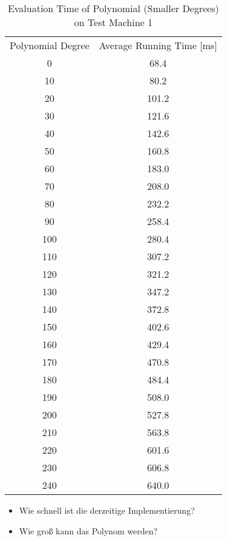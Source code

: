 \begin{table}[ht]
  \centering
  \begin{tabular}{|c|c|}
    Polynomial Degree & Average Running Time [ms] \\
    0  & 68.4 \\
    10 &  80.2 \\
    20 & 101.2 \\
    30 & 121.6 \\
    40 & 142.6 \\
    50 & 160.8 \\
    60 & 183.0 \\
    70 & 208.0 \\
    80 & 232.2 \\
    90 & 258.4 \\
    100 & 280.4 \\
    110 & 307.2 \\
    120 & 321.2 \\
    130 & 347.2 \\
    140 & 372.8 \\
    150 & 402.6 \\
    160 & 429.4 \\
    170 & 470.8 \\
    180 & 484.4 \\
    190 & 508.0 \\
    200 & 527.8 \\
    210 & 563.8 \\
    220 & 601.6 \\
    230 & 606.8 \\
    240 & 640.0 \\
  \end{tabular}
  \caption{Evaluation Time of Polynomial (Smaller Degrees) on Test Machine 1}
  \label{tab:poly-deg-t-small}
\end{table}




\begin{JWtodoBox}

\begin{itemize}

\item Wie schnell ist die derzeitige Implementierung?

\item Wie groß kann das Polynom werden?

\end{itemize}

\end{JWtodoBox}


